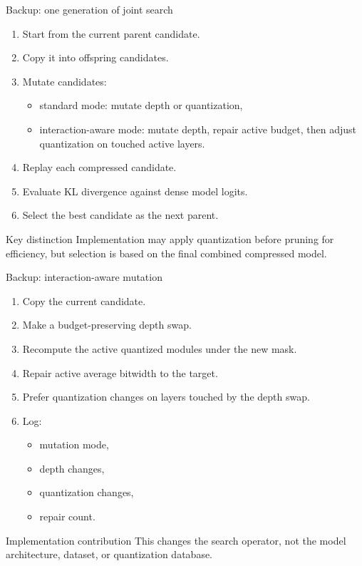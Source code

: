 \documentclass[aspectratio=169]{beamer}
\begin{document}

\begin{frame}{Backup: one generation of joint search}
\small
\begin{enumerate}
    \item Start from the current parent candidate.
    \item Copy it into offspring candidates.
    \item Mutate candidates:
    \begin{itemize}
        \item standard mode: mutate depth or quantization,
        \item interaction-aware mode: mutate depth, repair active budget, then adjust quantization on touched active layers.
    \end{itemize}
    \item Replay each compressed candidate.
    \item Evaluate KL divergence against dense model logits.
    \item Select the best candidate as the next parent.
\end{enumerate}

\vspace{0.15cm}
\begin{block}{Key distinction}
Implementation may apply quantization before pruning for efficiency, but selection is based on the final combined compressed model.
\end{block}
\end{frame}


\begin{frame}{Backup: interaction-aware mutation}
\small
\begin{enumerate}
    \item Copy the current candidate.
    \item Make a budget-preserving depth swap.
    \item Recompute the active quantized modules under the new mask.
    \item Repair active average bitwidth to the target.
    \item Prefer quantization changes on layers touched by the depth swap.
    \item Log:
    \begin{itemize}
        \item mutation mode,
        \item depth changes,
        \item quantization changes,
        \item repair count.
    \end{itemize}
\end{enumerate}

\vspace{0.15cm}
\begin{block}{Implementation contribution}
This changes the search operator, not the model architecture, dataset, or quantization database.
\end{block}
\end{frame}
\end{document}
